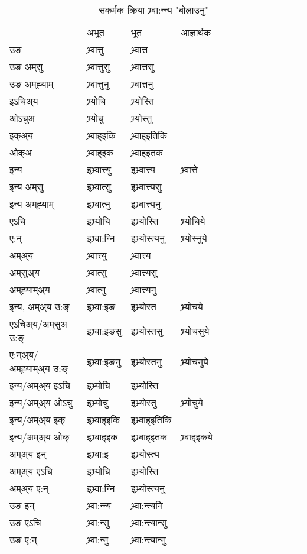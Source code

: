 \begin{table}[H]
\centering
\caption{\label{ott.vt} सकर्मक क्रिया  भ्र्वा:न्‍न्य  "बोलाउनु"  }
\begin{tabular}{l|l|l|l|l|l|l|l|l|l|l|l|l}  \toprule
&अभूत & भूत & आज्ञार्थक \\ 
उङ &भ्र्वात्तु &भ्र्वात्त \\ 
उङ अम्‌सु&भ्र्वात्तुसु &भ्र्वात्तसु \\ 
उङ अम्‌ह्‍याम्&भ्र्वात्तुनु &भ्र्वात्तनु \\ 
इऽचिअ्य &भ्र्योचि &भ्र्योस्ति   \\ 
ओऽचुअ        &भ्र्योचु &भ्र्योस्तु   \\ 
इक्अ्य&भ्र्वाह्इकि &भ्र्वाह्इतिकि   \\ 
ओक्अ &भ्र्वाह्इक &भ्र्वाह्इतक   \\ 
इन्य & इभ्र्वात्त्यु  & इभ्र्वात्त्य &भ्र्वात्ते  \\ 
इन्य अम्‌सु& इभ्र्वात्सु  & इभ्र्वात्त्यसु   \\ 
इन्य अम्‌ह्‍याम्& इभ्र्वात्‍नु  & इभ्र्वात्त्यनु   \\ 
एऽचि & इभ्र्योचि & इभ्र्योस्ति &भ्र्योचिये    \\ 
ए:न् & इभ्र्वा:न्‍नि  & इभ्र्योस्त्यनु &भ्र्योस्‍नुये  \\ 
अम्अ्य & भ्र्वात्त्यु  & भ्र्वात्त्य  \\ 
अम्‌सुअ्य & भ्र्वात्सु & भ्र्वात्त्यसु  \\ 
अम्‌ह्‍याम्अ्य & भ्र्वात्‍नु  & भ्र्वात्त्यनु \\ 
\midrule
इन्य, अम्अ्य उ:ङ्‌ &इभ्र्वा:इङ &इभ्र्योस्त &भ्र्योचये \\ 
एऽचिअ्य/अम्‌सुअ उ:ङ्‌ &इभ्र्वा:इङसु &इभ्र्योस्तसु &भ्र्योचसुये \\ 
ए:न्अ्य/अम्‌ह्‍याम्अ्य उ:ङ्‌ &इभ्र्वा:इङनु &इभ्र्योस्तनु &भ्र्योचनुये \\ 
इन्य/अम्अ्य इऽचि &इभ्र्योचि &इभ्र्योस्ति    \\ 
इन्य/अम्अ्य ओऽचु &इभ्र्योचु &इभ्र्योस्तु  &भ्र्योचुये  \\ 
इन्य/अम्अ्य इक् &इभ्र्वाह्इकि &इभ्र्वाह्इतिकि   \\ 
इन्य/अम्अ्य ओक् &इभ्र्वाह्इक &इभ्र्वाह्इतक  &भ्र्वाह्इकये  \\ 
अम्अ्य इन् & इभ्र्वा:इ & इभ्र्योस्त्य   \\ 
अम्अ्य एऽचि & इभ्र्योचि & इभ्र्योस्ति    \\ 
अम्अ्य ए:न् & इभ्र्वा:न्‍नि  & इभ्र्योस्त्यनु  \\ 
\midrule
उङ इन् & भ्र्वा:न्‍न्य  & भ्र्वा:न्त्यनि  \\ 
उङ एऽचि & भ्र्वा:न्सु  & भ्र्वा:न्त्यान्सु   \\ 
उङ ए:न्& भ्र्वा:न्‍नु  & भ्र्वा:न्त्यान्‍नु   \\ 
\bottomrule
\end{tabular}
\end{table}


